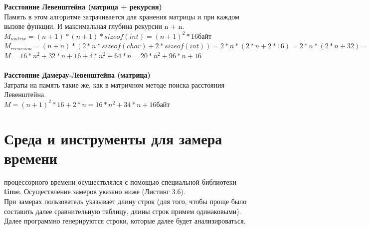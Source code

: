 \documentclass[12pt]{report}
\begin{document}
\textbf{Расстояние Левенштейна (матрица + рекурсия)}\\

Память в этом алгоритме затрачивается для хранения матрицы и при каждом вызове функции. И максимальная глубина рекурсии n + n.\\

$M_{matrix} = (n + 1)*(n + 1)*sizeof(int) = (n + 1)^2 * 16 байт$\\

$M_{recursion} = (n + n) * (2 * n * sizeof(char) + 2 * sizeof(int)) = 2 * n * (2 * n + 2 * 16) = 2 * n * (2 * n + 32) = 4 * n^2 + 64 * n байт$\\

$M = 16 * n^2 + 32 * n + 16 + 4 * n^2 + 64 * n = 20 * n^2 + 96 * n + 16$\\
\\

\textbf{Расстояние Дамерау-Левенштейна (матрица)}\\

Затраты на память такие же, как в матричном методе поиска расстояния Левенштейна.\\

$M = (n + 1)^2 * 16 + 2*n = 16 * n^2 + 34 * n + 16 байт$

\section{Среда и инструменты для замера времени}
 процессорного времени осуществлялся с помощью специальной библиотеки \textbf{time}. Осуществление замеров указано ниже (Листинг 3.6). \\

При замерах пользователь указывает длину строк (для того, чтобы проще было составить далее сравнительную таблицу, длины строк примем одинаковыми). Далее программно генерируются строки, которые далее будет анализироваться.\\
\end{document}

